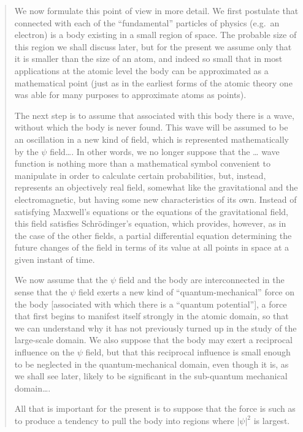\documentclass[11pt]{memoir}
\begin{document}
\begin{quote}
We now formulate this point of view in more detail. We first postulate
that connected with each of the ``fundamental'' particles of physics
(e.g.\ an electron) is a body existing in a small region of space. The
probable size of this region we shall discuss later, but for the present
we assume only that it is smaller than the size of an atom, and indeed
so small that in most applications at the atomic level the body can be
approximated as a mathematical point (just as in the earliest forms of
the atomic theory one was able for many purposes to approximate atoms as
points).

The next step is to assume that associated with this body there is a
wave, without which the body is never found. This wave will be assumed
to be an oscillation in a new kind of field, which is represented
mathematically by the $\psi$ field\ldots. In other words, we no longer
suppose that the \ldots{} wave function is nothing more than a
mathematical symbol convenient to manipulate in order to calculate
certain probabilities, but, instead, represents an objectively real
field, somewhat like the gravitational and the electromagnetic, but
having some new characteristics of its own. Instead of satisfying
Maxwell's equations or the equations of the gravitational field, this
field satisfies Schrödinger's equation, which provides, however, as in
the case of the other fields, a partial differential equation
determining the future changes of the field in terms of its value at all
points in space at a given instant of time.

We now assume that the $\psi$ field and the body are interconnected in
the sense that the $\psi$ field exerts a new kind of
``quantum-mechanical'' force on the body {[}associated with which there
is a ``quantum potential''{]}, a force that first begins to manifest
itself strongly in the atomic domain, so that we can understand why it
has not previously turned up in the study of the large-scale domain. We
also suppose that the body may exert a reciprocal influence on the
$\psi$ field, but that this reciprocal influence is small enough to be
neglected in the quantum-mechanical domain, even though it is, as we
shall see later, likely to be significant in the sub-quantum mechanical
domain\ldots.

All that is important for the present is to suppose that the force is
such as to produce a tendency to pull the body into regions where $|\psi|^2$ is
largest.


\end{quote}
\end{document}
